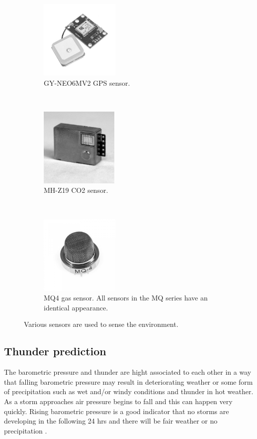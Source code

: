 \begin{figure}[t!]
    \centering
    \begin{subfigure}[t]{0.3\textwidth}
      \centering
      \includegraphics[height=1.5in]{GY-NEO6MV2-GPS}
      \caption{GY-NEO6MV2 GPS sensor.}
      \label{fig:GY-NEO6MV2-GPS}
    \end{subfigure}
    ~
    \begin{subfigure}[t]{0.3\textwidth}
        \centering
        \includegraphics[height=1.5in]{MH-Z19.jpg}
        \caption{MH-Z19 CO2 sensor.}
        \label{fig:MH-Z19}
    \end{subfigure}
    ~
    \begin{subfigure}[t]{0.3\textwidth}
        \centering
        \includegraphics[height=1.5in]{MQ4}
        \caption{MQ4 gas sensor. All sensors in the MQ series have an identical appearance. }
        \label{fig:MQ4}
    \end{subfigure}
    \caption{Various sensors are used to sense the environment. }
\end{figure}


\subsection{Thunder prediction}
The barometric pressure and thunder are hight associated to each other in a way that falling barometric pressure may result in
deteriorating weather or some form of precipitation such as wet and/or windy conditions and thunder in hot weather. As a
storm approaches air pressure begins to
fall and this can happen very quickly. Rising barometric pressure is a good indicator that no storms are developing in the
following 24 hrs and there will be fair weather or no precipitation \cite{thunder}.

